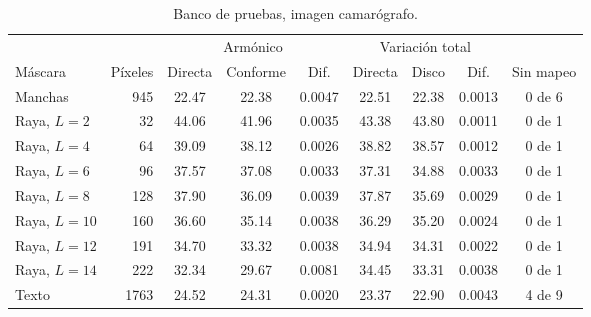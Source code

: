 \begin{table}[ht]
  \centering
  \caption{Banco de pruebas, imagen camarógrafo.}
  \label{tab:anexo-camarografo}
  \small
  \begin{tabular}{@{}lrccccccc@{}}
    \toprule
    & & \multicolumn{3}{c}{Armónico} & \multicolumn{3}{c}{Variación total} & \\
    \cmidrule(lr){3-5}\cmidrule(lr){6-8}
    Máscara & Píxeles & Directa & Conforme & Dif. & Directa & Disco & Dif. & Sin mapeo \\
    \midrule
    Manchas & 945 & 22.47 & 22.38 & 0.0047 & 22.51 & 22.38 & 0.0013 & 0 de 6 \\
    Raya, $L=2$ & 32 & 44.06 & 41.96 & 0.0035 & 43.38 & 43.80 & 0.0011 & 0 de 1 \\
    Raya, $L=4$ & 64 & 39.09 & 38.12 & 0.0026 & 38.82 & 38.57 & 0.0012 & 0 de 1 \\
    Raya, $L=6$ & 96 & 37.57 & 37.08 & 0.0033 & 37.31 & 34.88 & 0.0033 & 0 de 1 \\
    Raya, $L=8$ & 128 & 37.90 & 36.09 & 0.0039 & 37.87 & 35.69 & 0.0029 & 0 de 1 \\
    Raya, $L=10$ & 160 & 36.60 & 35.14 & 0.0038 & 36.29 & 35.20 & 0.0024 & 0 de 1 \\
    Raya, $L=12$ & 191 & 34.70 & 33.32 & 0.0038 & 34.94 & 34.31 & 0.0022 & 0 de 1 \\
    Raya, $L=14$ & 222 & 32.34 & 29.67 & 0.0081 & 34.45 & 33.31 & 0.0038 & 0 de 1 \\
    Texto & 1763 & 24.52 & 24.31 & 0.0020 & 23.37 & 22.90 & 0.0043 & 4 de 9 \\
    \bottomrule
  \end{tabular}
  \propia
\end{table}

